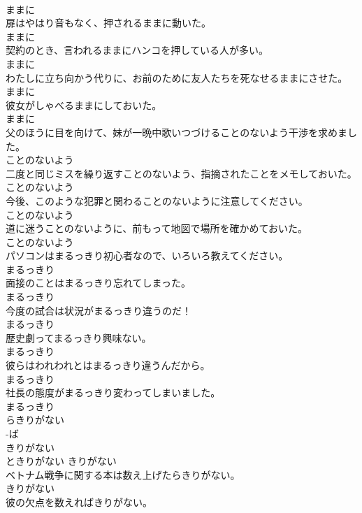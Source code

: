 \documentclass[8pt]{extreport}
\begin{document}
\begin{CJK}{UTF8}{min}
\\	ままに
\\	扉はやはり音もなく、押されるままに動いた。	
\\	ままに
\\	契約のとき、言われるままにハンコを押している人が多い。	
\\	ままに
\\	わたしに立ち向かう代りに、お前のために友人たちを死なせるままにさせた。	
\\	ままに
\\	彼女がしゃべるままにしておいた。	
\\	ままに
\\	父のほうに目を向けて、妹が一晩中歌いつづけることのないよう干渉を求めました。	
\\	ことのないよう
\\	二度と同じミスを繰り返すことのないよう、指摘されたことをメモしておいた。	
\\	ことのないよう
\\	今後、このような犯罪と関わることのないように注意してください。	
\\	ことのないよう
\\	道に迷うことのないように、前もって地図で場所を確かめておいた。	
\\	ことのないよう
\\	パソコンはまるっきり初心者なので、いろいろ教えてください。	
\\	まるっきり
\\	面接のことはまるっきり忘れてしまった。	
\\	まるっきり
\\	今度の試合は状況がまるっきり違うのだ！	
\\	まるっきり
\\	歴史劇ってまるっきり興味ない。	
\\	まるっきり
\\	彼らはわれわれとはまるっきり違うんだから。	
\\	まるっきり
\\	社長の態度がまるっきり変わってしまいました。	
\\	まるっきり
\\	らきりがない	
\\	-ば
\\	きりがない	
\\	ときりがない	きりがない
\\	ベトナム戦争に関する本は数え上げたらきりがない。	
\\	きりがない
\\	彼の欠点を数えればきりがない。	

\end{CJK}
\end{document}
